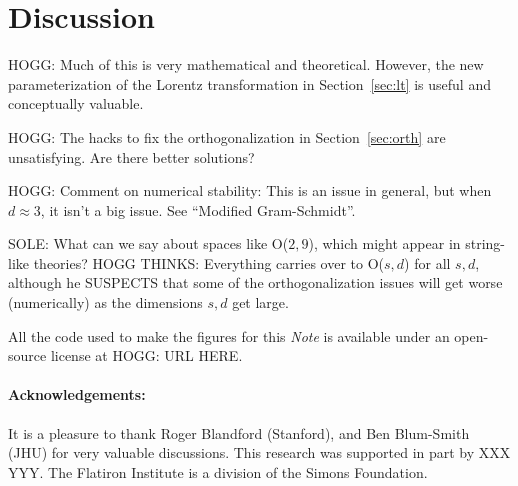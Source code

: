 \documentclass{article}
\newcommand{\documentname}{\textsl{Note}}
\newcommand{\secref}[1]{Section~\ref{#1}}
\begin{document}
\section{Discussion}\label{sec:discussion}

HOGG: Much of this is very mathematical and theoretical.
However, the new parameterization of the Lorentz transformation in \secref{sec:lt} is useful and conceptually valuable.

HOGG: The hacks to fix the orthogonalization in \secref{sec:orth} are unsatisfying. Are there better solutions?

HOGG: Comment on numerical stability: This is an issue in general, but when $d\approx 3$, it isn't a big issue. See ``Modified Gram-Schmidt''.

SOLE: What can we say about spaces like O($2,9$), which might appear in string-like theories?
HOGG THINKS: Everything carries over to O($s,d$) for all $s,d$, although he SUSPECTS that some of the orthogonalization issues will get worse (numerically) as the dimensions $s,d$ get large.

All the code used to make the figures for this \documentname{} is available under an open-source license at HOGG: URL HERE.

\paragraph{Acknowledgements:}
It is a pleasure to thank
  Roger Blandford (Stanford), and
  Ben Blum-Smith (JHU)
for very valuable discussions.
This research was supported in part by XXX YYY.
The Flatiron Institute is a division of the Simons Foundation.

\raggedright
\printbibliography
\end{document}

